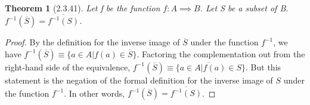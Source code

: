 \documentclass[a4paper, 12pt]{article}
\theoremstyle{plain}
\newtheorem*{theorem*}{Theorem}
\begin{document}
	
	\begin{theorem*}[2.3.41]
		Let f be the function $f: A \implies B$. Let S be a subset of B. 
		$f^{-1}(\overline{S}) = \overline{f^{-1}(S)}$.
	\end{theorem*}
	
	\begin{proof}
		By the definition for the inverse image of $\overline{S}$ under the function $f^{-1}$, 
		we have  $f^{-1}(\overline{S}) \equiv \{a \in A|f(a) \in \overline{S}\}$. Factoring the 
		complementation out from the right-hand side of the equivalence, 
		$f^{-1}(\overline{S}) \equiv \overline{\{a \in A | f(a) \in S}\}$. But this statement is the 
		negation of the formal definition for the inverse image of $S$ under the function $f^{-1}$. 
		In other words, $f^{-1}(\overline{S}) = \overline{f^{-1}(S)}$.
	\end{proof}
\end{document}

